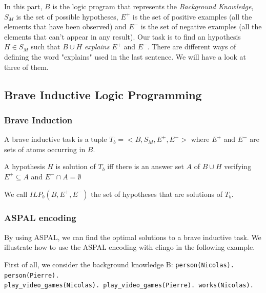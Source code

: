 In this part, $B$ is the logic program that represents the \textit{Background Knowledge}, $S_M$ is the set of possible hypotheses, $E^+$ is the set of positive examples (all the elements that have been observed) and $E^-$ is the set of negative examples (all the elements that can't appear in any result). Our task is to find an hypothesis $H\in S_M$ such that $B\cup H$ \textit{explains} $E^+$ and $E^-$. There are different ways of defining the word "explains" used in the last sentence. We will have a look at three of them.


\subsection{Brave Inductive Logic Programming}

\subsubsection{Brave Induction}

\begin{definition}

A brave inductive task is a tuple $T_b=<B, S_M, E^+, E^->$ where $E^+$ and $E^-$ are sets of atoms occurring in $B$. 

\smallskip

A hypothesis $H$ is solution of $T_b$ iff there is an answer set $A$ of $B\cup H$ verifying $E^+\subseteq A$ and $E^-\cap A = \emptyset$

\smallskip

We call $ILP_b(B,E^+,E^-)$ the set of hypotheses that are solutions of $T_b$. 

\end{definition}

\subsubsection{ASPAL encoding}

By using ASPAL, we can find the optimal solutions to a brave inductive task. We
illustrate how to use the ASPAL encoding with clingo in the following example.\bigskip

First of all, we consider the background knowledge B:\newline
\texttt{person(Nicolas). person(Pierre).\\
play\_video\_games(Nicolas). play\_video\_games(Pierre). works(Nicolas).}\\

